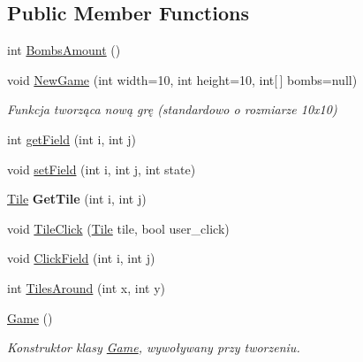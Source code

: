 \subsection*{Public Member Functions}
\begin{DoxyCompactItemize}
\item 
int \mbox{\hyperlink{class_saper_1_1_game_a68a874323b134ee545e72de1d332f11a}{Bombs\+Amount}} ()
\item 
void \mbox{\hyperlink{class_saper_1_1_game_ada46d1d0719becfbff58cd5ab3d502c6}{New\+Game}} (int width=10, int height=10, int\mbox{[}$\,$\mbox{]} bombs=null)
\begin{DoxyCompactList}\small\item\em Funkcja tworząca nową grę (standardowo o rozmiarze 10x10) \end{DoxyCompactList}\item 
int \mbox{\hyperlink{class_saper_1_1_game_a6ad3e962eca53c2dbf6b499a469fa5f2}{get\+Field}} (int i, int j)
\item 
void \mbox{\hyperlink{class_saper_1_1_game_aa62b5814c25458101aaf843271dcff83}{set\+Field}} (int i, int j, int state)
\item 
\mbox{\label{class_saper_1_1_game_aad59b3c8d1d9ca582a9b508aad99631a}} 
\mbox{\hyperlink{class_saper_1_1_tile}{Tile}} {\bfseries Get\+Tile} (int i, int j)
\item 
void \mbox{\hyperlink{class_saper_1_1_game_ad7088e52259cb63a068213bf2856eebb}{Tile\+Click}} (\mbox{\hyperlink{class_saper_1_1_tile}{Tile}} tile, bool user\+\_\+click)
\item 
void \mbox{\hyperlink{class_saper_1_1_game_a87c8f7562e380781913a182aab6e093d}{Click\+Field}} (int i, int j)
\item 
int \mbox{\hyperlink{class_saper_1_1_game_a77640c9261a148c9e68f28b0b02b57c8}{Tiles\+Around}} (int x, int y)
\item 
\mbox{\hyperlink{class_saper_1_1_game_a9d694a044fb311e088ce585b716a9d84}{Game}} ()
\begin{DoxyCompactList}\small\item\em Konstruktor klasy \mbox{\hyperlink{class_saper_1_1_game}{Game}}, wywoływany przy tworzeniu. \end{DoxyCompactList}\end{DoxyCompactItemize}
